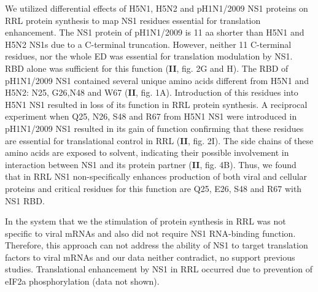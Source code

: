 		We utilized differential effects of H5N1, H5N2 and pH1N1/2009 NS1 proteins on RRL protein synthesis to map NS1 residues essential for translation enhancement. The NS1 protein of pH1N1/2009 is 11 \gls{aa} shorter than H5N1 and H5N2 \glspl{NS1} due to a C-terminal truncation. However, neither 11 C-terminal residues, nor the whole \gls{ED} was essential for translation modulation by \gls{NS1}. RBD alone was sufficient for this function (\textbf{II}, fig. 2G and H). The RBD of pH1N1/2009 NS1 contained several unique amino acids different from H5N1 and H5N2: N25, G26,N48 and W67 (\textbf{II}, fig. 1A). Introduction of this residues into H5N1 NS1 resulted in loss of its function in RRL protein synthesis. A reciprocal experiment when Q25, N26, S48 and R67 from H5N1 NS1 were introduced in pH1N1/2009 NS1 resulted in its gain of function confirming that these residues are essential for translational control in RRL (\textbf{II}, fig. 2I). The side chains of these amino acids are exposed to solvent, indicating their possible involvement in interaction between NS1 and its protein partner (\textbf{II}, fig. 4B). Thus, we found that in \gls{RRL} NS1 non-specifically enhances production of both viral and cellular proteins and critical residues for this function are Q25, E26, S48 and R67 with \gls{NS1} \gls{RBD}.
		
		In the system that we the stimulation of protein synthesis in \gls{RRL} was not specific to viral mRNAs and also did not require NS1 RNA-binding function. Therefore, this approach can not address the ability of NS1 to target translation factors to viral mRNAs and our data neither contradict, no support previous studies. Translational enhancement by NS1 in RRL occurred due to prevention of \gls{eIF2a} phosphorylation (data not shown). 
		
